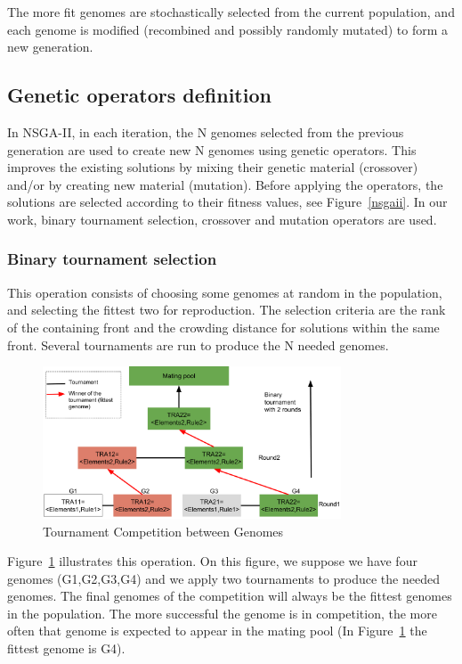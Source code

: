 \documentclass[conference]{IEEEtran}
\begin{document}
The more fit genomes are stochastically selected from the current population, and each genome is modified (recombined and possibly randomly mutated) to form a new generation.

\subsection{Genetic operators definition}
In NSGA-II, in each iteration, the N genomes selected from the previous generation are used to create new N genomes using genetic operators. This improves the existing solutions by mixing their genetic material (crossover) and/or by creating new material (mutation). Before applying the operators, the solutions are selected according to their fitness values, see Figure~\ref{nsgaii}. In our work, binary tournament selection, crossover and mutation operators are used.

\subsubsection{\textbf{Binary tournament selection}}
This operation consists of choosing some genomes at random in the population, and selecting the fittest two for reproduction. The selection criteria are the rank of the containing front and the crowding distance for solutions within the same front. Several tournaments are run to produce the N needed genomes.

\begin{figure}[!ht]
\centering
\includegraphics[width=3.49in]{bt.pdf}
\caption{Tournament Competition between Genomes}
\label{binary}
\end{figure}

Figure~\ref{binary} illustrates this operation. On this figure, we suppose we have four genomes (G1,G2,G3,G4) and we apply two tournaments to produce the needed genomes. The final genomes of the competition will always be the fittest genomes in the population. The more successful the genome is in competition, the more often that genome is expected to appear in the mating pool (In Figure~\ref{binary} the fittest genome is G4).
\end{document}
